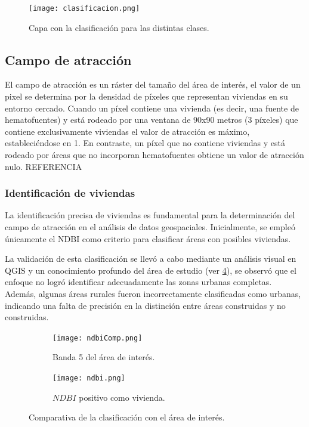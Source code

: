 \begin{figure}[H]
	\texttt{[image: clasificacion.png]}
	\centering
	\caption{Capa con la clasificación para las distintas clases.}
	\label{fig:clasificacion}
\end{figure}

\subsection{Campo de atracción} \label{campo-de-atraccion}

El campo de atracción es un ráster del tamaño del área de interés, el valor de un pixel se determina por la densidad de píxeles que representan viviendas en su entorno cercado. Cuando un píxel contiene una vivienda (es decir, una fuente de hematofuentes) y está rodeado por una ventana de 90x90 metros (3 píxeles) que contiene exclusivamente viviendas el valor de atracción es máximo, estableciéndose en 1. En contraste, un píxel que no contiene viviendas y está rodeado por áreas que no incorporan hematofuentes obtiene un valor de atracción nulo. REFERENCIA

\subsubsection{Identificación de viviendas}

La identificación precisa de viviendas es fundamental para la determinación del campo de atracción en el análisis de datos geospaciales. Inicialmente, se empleó únicamente el NDBI como criterio para clasificar áreas con posibles viviendas. 

La validación de esta clasificación se llevó a cabo mediante un análisis visual en QGIS y un conocimiento profundo del área de estudio (ver \figurename \ref{fig:comparativa-ndbi}), se observó que el enfoque no logró identificar adecuadamente las zonas urbanas completas. Además, algunas áreas rurales fueron incorrectamente clasificadas como urbanas, indicando una falta de precisión en la distinción entre áreas construidas y no construidas.

\begin{figure}[!tbp]
	\begin{subfigure}[b]{0.49\textwidth}
		\texttt{[image: ndbiComp.png]}
		\caption{Banda 5 del área de interés.}
		\label{fig:f1}
	\end{subfigure}
	\hfill
	\begin{subfigure}[b]{0.49\textwidth}
		\texttt{[image: ndbi.png]}
		\caption{$NDBI$ positivo como vivienda.}
		\label{fig:f2}
	\end{subfigure}
	\caption{Comparativa de la clasificación con el área de interés.}
	\label{fig:comparativa-ndbi}
\end{figure}


